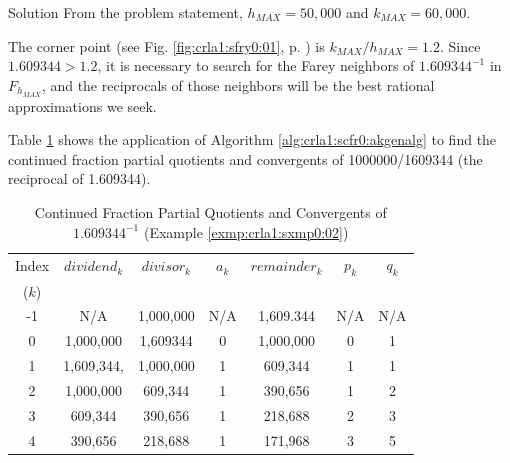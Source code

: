 \begin{vworkexampleparsection}{Solution} From the problem statement,
$h_{MAX}=50,\!000$ and $k_{MAX}=60,\!000$.

The corner point (see Fig. \ref{fig:crla1:sfry0:01}, p. \pageref{fig:crla1:sfry0:01})
is $k_{MAX}/h_{MAX} = 1.2$\@.  Since $1.609344 > 1.2$, it is necessary to search
for the Farey neighbors of $1.609344^{-1}$ in $F_{h_{MAX}}$, and the reciprocals
of those neighbors will be the best rational approximations we seek.

Table \ref{tbl:crla1:sxmp0:02} shows the application of Algorithm
\ref{alg:crla1:scfr0:akgenalg} to find the continued fraction partial
quotients and convergents of 1000000/1609344 (the reciprocal of 1.609344).

\begin{table}
\caption{Continued Fraction Partial Quotients and Convergents of $1.609344^{-1}$ (Example \ref{exmp:crla1:sxmp0:02})}
\label{tbl:crla1:sxmp0:02}
\begin{center}
\begin{tabular}{|c|c|c|c|c|c|c|}
\hline
\small{Index} & \small{$dividend_k$}      & \small{$divisor_k$}        & \small{$a_k$}   & \small{$remainder_k$}   & \small{$p_k$}      & \small{$q_k$}       \\
\small{($k$)} &                           &                            &                 &                         &                    &                     \\
\hline
\hline
\small{-1}    & \small{N/A}               & \small{1,000,000}          & \small{N/A}     & \small{1,609.344}       & \small{N/A}        & \small{N/A}         \\
\hline
\small{0}     &  \small{1,000,000}        & \small{1,609344}           & \small{0}       & \small{1,000,000}       & \small{0}          & \small{1}           \\
\hline
\small{1}     & \small{1,609,344,}        & \small{1,000,000}          & \small{1}       & \small{609,344}         & \small{1}          & \small{1}           \\
\hline
\small{2}     & \small{1,000,000}         & \small{609,344}            & \small{1}       & \small{390,656}         & \small{1}          & \small{2}           \\
\hline
\small{3}     & \small{609,344}           & \small{390,656}            & \small{1}       & \small{218,688}         & \small{2}          & \small{3}           \\
\hline
\small{4}     & \small{390,656}           & \small{218,688}            & \small{1}       & \small{171,968}         & \small{3}          & \small{5}           \\

\end{tabular}
\end{center}
\end{table}
\end{vworkexampleparsection}
